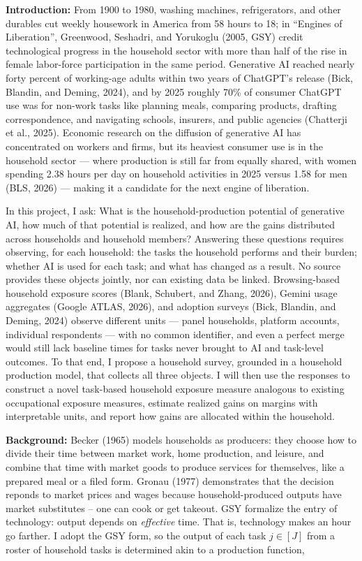 \documentclass[11pt]{article}
\begin{document}
\noindent\textbf{Introduction:} From 1900 to 1980, washing machines, refrigerators, and other durables cut weekly housework in America from 58 hours to 18; in ``Engines of Liberation'', Greenwood, Seshadri, and Yorukoglu (2005, GSY) credit technological progress in the household sector with more than half of the rise in female labor-force participation in the same period. Generative AI reached nearly forty percent of working-age adults within two years of ChatGPT's release (Bick, Blandin, and Deming, 2024), and by 2025 roughly 70\% of consumer ChatGPT use was for non-work tasks like planning meals, comparing products, drafting correspondence, and navigating schools, insurers, and public agencies (Chatterji et al., 2025). Economic research on the diffusion of generative AI has concentrated on workers and firms, but its heaviest consumer use is in the household sector — where production is still far from equally shared, with women spending 2.38 hours per day on household activities in 2025 versus 1.58 for men (BLS, 2026) — making it a candidate for the next engine of liberation.

In this project, I ask: What is the household-production potential of generative AI, how much of that potential is realized, and how are the gains distributed across households and household members? Answering these questions requires observing, for each household: the tasks the household performs and their burden; whether AI is used for each task; and what has changed as a result. No source provides these objects jointly, nor can existing data be linked. Browsing-based household exposure scores (Blank, Schubert, and Zhang, 2026), Gemini usage aggregates (Google ATLAS, 2026), and adoption surveys (Bick, Blandin, and Deming, 2024) observe different units — panel households, platform accounts, individual respondents — with no common identifier, and even a perfect merge would still lack baseline times for tasks never brought to AI and task-level outcomes. To that end, I propose a household survey, grounded in a household production model, that collects all three objects. I will then use the responses to construct a novel task-based household exposure measure analogous to existing occupational exposure measures, estimate realized gains on margins with interpretable units, and report how gains are allocated within the household.


\smallskip
\noindent\textbf{Background:} Becker (1965) models households as producers: they choose how to divide their time between market work, home production, and leisure, and combine that time with market goods to produce services for themselves, like a prepared meal or a filed form. Gronau (1977) demonstrates that the decision reponds to market prices and wages because household-produced outputs have market substitutes -- one can cook or get takeout. GSY formalize the entry of technology: output depends on \emph{effective} time. That is, technology makes an hour go farther. I adopt the GSY form, so the output of each task $j \in [J]$ from a roster of household tasks is determined akin to a production function,
\end{document}

